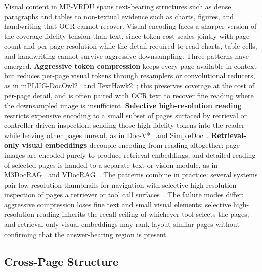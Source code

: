 \documentclass[11pt]{article}
\begin{document}
Visual content in MP-VRDU spans text-bearing structures such as dense paragraphs and tables to non-textual evidence such as charts, figures, and handwriting that OCR cannot recover. Visual encoding faces a sharper version of the coverage-fidelity tension than text, since token cost scales jointly with page count and per-page resolution while the detail required to read charts, table cells, and handwriting cannot survive aggressive downsampling. Three patterns have emerged. \textbf{Aggressive token compression} keeps every page available in context but reduces per-page visual tokens through resamplers or convolutional reducers, as in mPLUG-DocOwl2~\cite{hu2025mplugdocowl2} and TextHawk2~\cite{yu2024texthawk2}; this preserves coverage at the cost of per-page detail, and is often paired with OCR text to recover fine reading where the downsampled image is insufficient. \textbf{Selective high-resolution reading} restricts expensive encoding to a small subset of pages surfaced by retrieval or controller-driven inspection, sending those high-fidelity tokens into the reader while leaving other pages unread, as in Doc-V*~\cite{zheng2026docv} and SimpleDoc~\cite{jain2025simpledoc}. \textbf{Retrieval-only visual embeddings} decouple encoding from reading altogether: page images are encoded purely to produce retrieval embeddings, and detailed reading of selected pages is handed to a separate text or vision module, as in M3DocRAG~\cite{cho2024m3docrag} and VDocRAG~\cite{tanaka2025vdocrag}. The patterns combine in practice: several systems pair low-resolution thumbnails for navigation with selective high-resolution inspection of pages a retriever or tool call surfaces~\cite{zheng2026docv,jain2025simpledoc}. The failure modes differ: aggressive compression loses fine text and small visual elements; selective high-resolution reading inherits the recall ceiling of whichever tool selects the pages; and retrieval-only visual embeddings may rank layout-similar pages without confirming that the answer-bearing region is present.

\subsection{Cross-Page Structure}
\label{sec:modality-structure}
\end{document}
